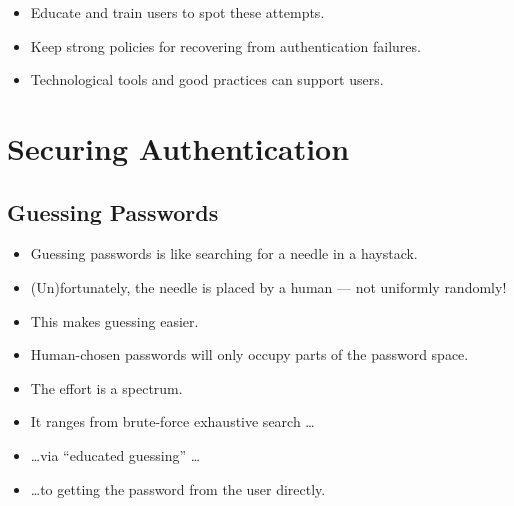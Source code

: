 \begin{frame}
  \begin{solution}
    \begin{itemize}
      \item Educate and train users to spot these attempts.

      \item Keep strong policies for recovering from authentication failures. 

      \item Technological tools and good practices can support users.
    \end{itemize}
  \end{solution}
\end{frame}


\section[Securing]{Securing Authentication}

\subsection{Guessing Passwords}

\begin{frame}
  \begin{itemize}
    \item Guessing passwords is like searching for a needle in a haystack.

      \pause{}

    \item (Un)fortunately, the needle is placed by a human --- not uniformly 
      randomly!
    \item This makes guessing easier.
    \item Human-chosen passwords will only occupy parts of the password space.
  \end{itemize}
\end{frame}

\begin{frame}
  \begin{itemize}
    \item The effort is a spectrum.

    \item It ranges from brute-force exhaustive search \dots

      \pause{}

    \item \dots via \enquote{educated guessing} \dots

      \pause{}

    \item \dots to getting the password from the user directly.
  \end{itemize}
\end{frame}

